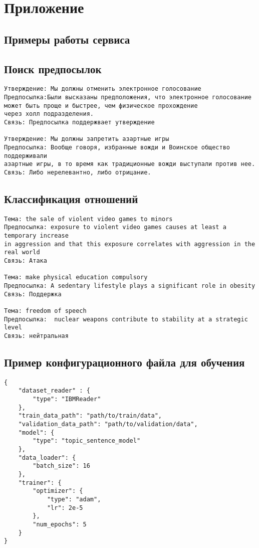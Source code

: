 \section{Приложение}
\subsection{Примеры работы сервиса}
\subsection{Поиск предпосылок}

\begin{verbatim}
Утверждение: Мы должны отменить электронное голосование
Предпосылка:Были высказаны предположения, что электронное голосование 
может быть проще и быстрее, чем физическое прохождение 
через холл подразделения.
Связь: Предпосылка поддержвает утверждение

Утверждение: Мы должны запретить азартные игры
Предпосылка: Вообще говоря, избранные вожди и Воинское общество поддерживали
азартные игры, в то время как традиционные вожди выступали против нее.
Связь: Либо нерелевантно, либо отрицание.
\end{verbatim}

\subsection{Классификация отношений}
\begin{verbatim}
Тема: the sale of violent video games to minors
Предпосылка: exposure to violent video games causes at least a temporary increase 
in aggression and that this exposure correlates with aggression in the real world
Связь: Атака

Тема: make physical education compulsory
Предпосылка: A sedentary lifestyle plays a significant role in obesity
Связь: Поддержка

Тема: freedom of speech
Предпосылка:  nuclear weapons contribute to stability at a strategic level
Связь: нейтральная
\end{verbatim}

\subsection{Пример конфигурационного файла для обучения}
\label{sec:jsonnet}
\begin{verbatim}
{
    "dataset_reader" : {
        "type": "IBMReader"
    },
    "train_data_path": "path/to/train/data",
    "validation_data_path": "path/to/validation/data",
    "model": {
        "type": "topic_sentence_model"
    },
    "data_loader": {
        "batch_size": 16
    },
    "trainer": {
        "optimizer": {
            "type": "adam",
            "lr": 2e-5
        },
        "num_epochs": 5
    }
}
\end{verbatim}